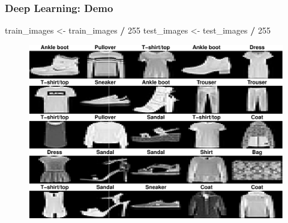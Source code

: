 \documentclass[
  shownotes,
  xcolor={svgnames},
  hyperref={colorlinks,citecolor=DarkBlue,linkcolor=DarkRed,urlcolor=DarkBlue}
  , aspectratio=169]{beamer}
\newenvironment{Shaded}{\begin{snugshade}}{\end{snugshade}}
\newcommand{\DecValTok}[1]{\textcolor[rgb]{0.00,0.00,0.81}{#1}}
\newcommand{\NormalTok}[1]{#1}
\newcommand{\OperatorTok}[1]{\textcolor[rgb]{0.81,0.36,0.00}{\textbf{#1}}}
\newcommand{\StringTok}[1]{\textcolor[rgb]{0.31,0.60,0.02}{#1}}
\begin{document}
\begin{frame}[fragile]
\frametitle{Deep Learning: Demo}

\begin{Shaded}
\begin{Highlighting}[]
\NormalTok{train\_images \textless{}{-}}\StringTok{ }\NormalTok{train\_images }\OperatorTok{/}\StringTok{ }\DecValTok{255}
\NormalTok{test\_images \textless{}{-}}\StringTok{ }\NormalTok{test\_images }\OperatorTok{/}\StringTok{ }\DecValTok{255}
\end{Highlighting}
\end{Shaded}

  \begin{figure}[H] \centering
            \captionsetup{justification=centering}
              \includegraphics[scale=0.4]{figures/unnamed-chunk-5-1.pdf}
              
 \end{figure}

 \end{frame}
\end{document}
